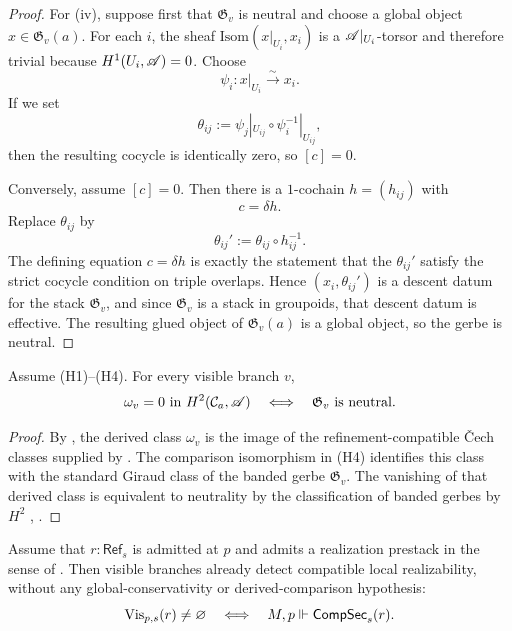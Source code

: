 \begin{proof}
For \textup{(iv)}, suppose first that $\mathfrak G_v$ is neutral and choose a global object $x\in \mathfrak G_v(a)$. For each $i$, the sheaf $\mathrm{Isom}(x|_{U_i},x_i)$ is a $\mathscr{A}|_{U_i}$-torsor and therefore trivial because $H^1(U_i,\mathscr{A})=0$. Choose
\[
\psi_i:x|_{U_i}\xrightarrow{\sim} x_i.
\]
If we set
\[
\theta_{ij}:=\psi_j|_{U_{ij}}\circ \psi_i^{-1}|_{U_{ij}},
\]
then the resulting cocycle is identically zero, so $[c]=0$.

Conversely, assume $[c]=0$. Then there is a $1$-cochain $h=(h_{ij})$ with
\[
c=\delta h.
\]
Replace $\theta_{ij}$ by
\[
\theta_{ij}':=\theta_{ij}\circ h_{ij}^{-1}.
\]
The defining equation $c=\delta h$ is exactly the statement that the $\theta_{ij}'$ satisfy the strict cocycle condition on triple overlaps. Hence $(x_i,\theta_{ij}')$ is a descent datum for the stack $\mathfrak G_v$, and since $\mathfrak G_v$ is a stack in groupoids, that descent datum is effective. The resulting glued object of $\mathfrak G_v(a)$ is a global object, so the gerbe is neutral.
\end{proof}

\begin{proposition}\label{prop:derived-branch-classification}
Assume \textup{(H1)}--\textup{(H4)}. For every visible branch $v$,
\[
\omega_v=0\ \text{in}\ H^2(\mathcal C_a,\mathscr{A})
\quad\Longleftrightarrow\quad
\mathfrak G_v\ \text{is neutral}.
\]
\end{proposition}

\begin{proof}
By , the derived class $\omega_v$ is the image of the refinement-compatible \v{C}ech classes supplied by . The comparison isomorphism in \textup{(H4)} identifies this class with the standard Giraud class of the banded gerbe $\mathfrak G_v$. The vanishing of that derived class is equivalent to neutrality by the classification of banded gerbes by $H^2$ \cite[Chap.~IV]{Giraud1971}, \cite[Tag 06NY]{StacksProject}.
\end{proof}

\begin{proposition}\label{prop:compsecs-vs-visible-branches}
Assume that $r:\mathsf{Ref}_s$ is admitted at $p$ and admits a realization prestack in the sense of . Then visible branches already detect compatible local realizability, without any global-conservativity or derived-comparison hypothesis:
\[
\mathrm{Vis}_{p,s}(r)\neq\varnothing
\quad\Longleftrightarrow\quad
M,p\Vdash \mathsf{CompSec}_s(r).
\]
\end{proposition}

